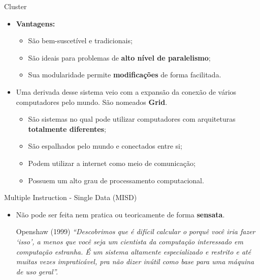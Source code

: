 \begin{frame}{Cluster}
    \begin{itemize}
		\item \textbf{Vantagens:}
		\begin{itemize}
			\item São bem-suscetível e tradicionais;
			\item São ideais para problemas de \textbf{alto nível de paralelismo};
			\item Sua modularidade permite \textbf{modificações} de forma facilitada. 
		\end{itemize}

		\item Uma derivada desse sistema veio com a expansão da conexão de vários computadores pelo mundo. São nomeados \textbf{Grid}.
		\begin{itemize}
			\item São sistemas no qual pode utilizar computadores com arquiteturas \textbf{totalmente diferentes};
			\item São espalhados pelo mundo e conectados entre si;
			\item Podem utilizar a internet como meio de comunicação;
			\item Possuem um alto grau de processamento computacional.
		\end{itemize}

	\end{itemize}

\end{frame}









\begin{frame}{Multiple Instruction - Single Data (MISD)}
	\begin{itemize}
		\item Não pode ser feita nem pratica ou teoricamente de forma \textbf{sensata}.
		
				\bigskip
		
		\begin{block}{Openshaw (1999)}
		    {\it ``Descobrimos que é difícil calcular o porquê você iria fazer `isso', a menos que você seja um cientista da computação interessado em computação estranha. É um sistema altamente especializado e restrito e até muitas vezes impraticável, pra não dizer inútil como base para uma máquina de uso geral''.}
		\end{block}
		
	\end{itemize}

\end{frame}


